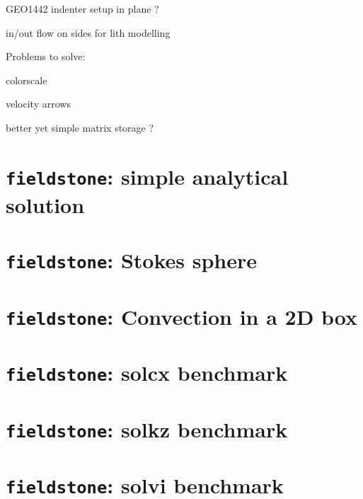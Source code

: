 \documentclass[a4paper]{article}
\begin{document}
GEO1442 indenter setup in plane ?

in/out flow on sides for lith modelling

\noindent Problems to solve:

colorscale 

velocity arrows 

better yet simple matrix storage ?


\newpage
\section{{\tt fieldstone}: simple analytical solution}


\newpage
\section{{\tt fieldstone}: Stokes sphere }


\newpage
\section{{\tt fieldstone}: Convection in a 2D box}


\newpage
\section{{\tt fieldstone}: solcx benchmark}


\newpage
\section{{\tt fieldstone}: solkz benchmark}


\newpage
\section{{\tt fieldstone}: solvi benchmark}

\end{document}
